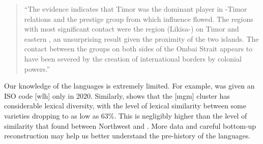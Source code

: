 \begin{quote}
		“The evidence indicates that Timor was the dominant player in
		-Timor relations and the prestige group from which influence flowed.
		The regions with most significant contact were the  region
		(Likisa-) on Timor and eastern , an unsurprising result given the proximity
		of the two islands.
		The contact between the groups on both sides of the Ombai Strait
		appears to have been severed by the creation of international
		borders by colonial powers.” \citep[112]{SchapperWellfelt2018} 
\end{quote}

Our knowledge of the  languages is extremely limited.
For example,  was given an ISO code [wlh] only in 2020.
Similarly, \citet[75--93]{Fogaca2017} shows that the  [mgm]
cluster has considerable lexical diversity,
with the level of lexical similarity between some varieties dropping
to as low as 63{\%}.
This is negligibly higher than the level of similarity that \citet[35]{Edwards2019}
found between Northwest  and .
More data and careful bottom-up reconstruction may help us better
understand the pre-history of the  languages.